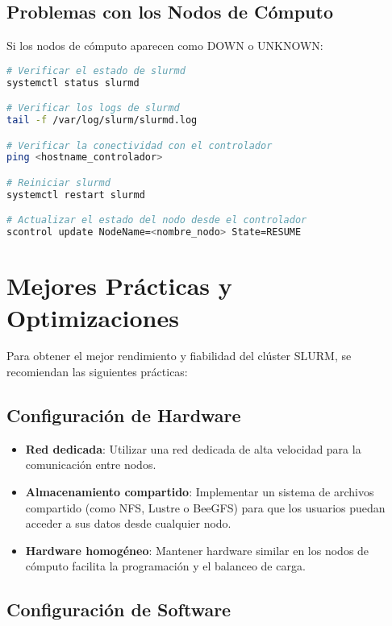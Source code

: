 \documentclass[12pt,a4paper]{article}
\begin{document}
\subsection{Problemas con los Nodos de Cómputo}

Si los nodos de cómputo aparecen como DOWN o UNKNOWN:

\begin{lstlisting}[language=bash, caption=Solución de problemas de nodos]
# Verificar el estado de slurmd
systemctl status slurmd

# Verificar los logs de slurmd
tail -f /var/log/slurm/slurmd.log

# Verificar la conectividad con el controlador
ping <hostname_controlador>

# Reiniciar slurmd
systemctl restart slurmd

# Actualizar el estado del nodo desde el controlador
scontrol update NodeName=<nombre_nodo> State=RESUME
\end{lstlisting}

\section{Mejores Prácticas y Optimizaciones}

Para obtener el mejor rendimiento y fiabilidad del clúster SLURM, se recomiendan las siguientes prácticas:

\subsection{Configuración de Hardware}

\begin{itemize}[leftmargin=*]
    \item \textbf{Red dedicada}: Utilizar una red dedicada de alta velocidad para la comunicación entre nodos.
    \item \textbf{Almacenamiento compartido}: Implementar un sistema de archivos compartido (como NFS, Lustre o BeeGFS) para que los usuarios puedan acceder a sus datos desde cualquier nodo.
    \item \textbf{Hardware homogéneo}: Mantener hardware similar en los nodos de cómputo facilita la programación y el balanceo de carga.
\end{itemize}

\subsection{Configuración de Software}
\end{document}
